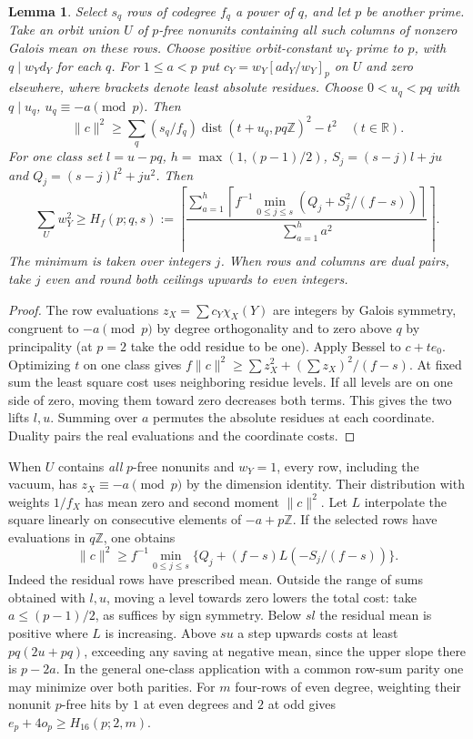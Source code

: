 \documentclass[11pt]{amsart}
\numberwithin{equation}{section}
\newtheorem{lemma}[theorem]{Lemma}
\theoremstyle{definition}
\theoremstyle{plain}
\newcommand{\ZZ}{\mathbb Z}
\begin{document}
\begin{lemma}\label{result:joint-projection}
Select $s_q$ rows of codegree $f_q$ a power of $q$, and let $p$ be
another prime. Take an orbit union $U$ of $p$-free nonunits containing
all such columns of nonzero Galois mean on these rows. Choose positive
orbit-constant $w_Y$ prime to $p$, with $q\mid w_Yd_Y$ for each $q$.
For $1\le a<p$ put $c_Y=w_Y[ad_Y/w_Y]_p$ on $U$ and zero elsewhere,
where brackets denote least absolute residues. Choose
$0<u_q<pq$ with $q\mid u_q$, $u_q\equiv-a\pmod p$. Then
\[
 \|c\|^2\ge\sum_q(s_q/f_q)\operatorname{dist}(t+u_q,pq\ZZ)^2-t^2
 \quad(t\in\mathbb R).
\]
For one class set $l=u-pq$, $h=\max(1,(p-1)/2)$,
$S_j=(s-j)l+ju$ and $Q_j=(s-j)l^2+ju^2$. Then
\[
 \sum_Uw_Y^2\ge H_f(p;q,s):=
 \left\lceil\frac{\sum_{a=1}^h
 \left\lceil f^{-1}\min_{0\le j\le s}(Q_j+S_j^2/(f-s))\right\rceil}
 {\sum_{a=1}^h a^2}\right\rceil .
\]
The minimum is taken over integers $j$. When rows and columns are dual pairs,
take $j$ even and round both ceilings upwards to even integers.
\end{lemma}
\begin{proof}
The row evaluations $z_X=\sum c_Y\chi_X(Y)$ are integers by Galois
symmetry, congruent to $-a\pmod p$ by degree orthogonality and to
zero above $q$ by principality (at $p=2$ take the odd residue to be
one). Apply Bessel to $c+te_0$. Optimizing $t$ on one class gives
$f\|c\|^2\ge\sum z_X^2+(\sum z_X)^2/(f-s)$.
At fixed sum the least square cost uses neighboring residue levels.
If all levels are on one side of zero, moving them toward zero
decreases both terms. This gives the two lifts $l,u$. Summing over
$a$ permutes the absolute residues at each coordinate. Duality
pairs the real evaluations and the coordinate costs.
\end{proof}
When $U$ contains \emph{all} $p$-free nonunits and $w_Y=1$, every
row, including the vacuum, has $z_X\equiv-a\pmod p$ by the dimension
identity. Their distribution with weights $1/f_X$ has mean zero and
second moment $\|c\|^2$. Let $L$ interpolate the square linearly on
consecutive elements of $-a+p\ZZ$. If the selected rows have
evaluations in $q\ZZ$, one obtains
\begin{equation}\label{eq:full-census}
 \|c\|^2\ge f^{-1}\min_{0\le j\le s}
       \{Q_j+(f-s)L(-S_j/(f-s))\}.
\end{equation}
Indeed the residual rows have prescribed mean. Outside the range
of sums obtained with $l,u$, moving a level towards zero lowers the
total cost: take $a\le(p-1)/2$, as suffices by sign symmetry. Below
$s l$ the residual mean is positive where $L$ is increasing. Above
$s u$ a step upwards costs at least $pq(2u+pq)$, exceeding any
saving at negative mean, since the upper slope there is $p-2a$.
In the general one-class application with a common row-sum parity
one may minimize over both parities. For $m$ four-rows of even
degree, weighting their nonunit $p$-free hits by $1$ at even
degrees and $2$ at odd gives $e_p+4o_p\ge H_{16}(p;2,m)$.
\end{document}

